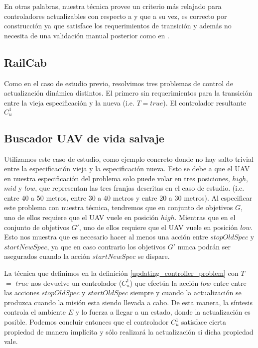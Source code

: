 En otras palabras, nuestra técnica provee un criterio más relajado para controladores actualizables con respecto a
\cite{6224401} y que a su vez, es correcto por construcción ya que satisface los requerimientos de transición y además
no necesita de una validación manual posterior como en \cite{PanzicaLaManna:2013:FCC:2487336.2487349}.

\subsection{RailCab}

Como en el caso de estudio previo, resolvimos tres problemas de control de actualización dinámica distintos. El primero
sin requerimientos para la transición entre la vieja especificación y la nueva (i.e. $T = true$). El controlador
resultante $C^1_u$

\subsection{Buscador UAV de vida salvaje}

Utilizamos este caso de estudio, como ejemplo concreto donde no hay salto trivial entre la especificación vieja y la
especificación nueva. Esto se debe a que el UAV en nuestra especificación del problema solo puede volar en tres
posiciones, $high$, $mid$ y $low$, que representan las tres franjas descritas en el caso de estudio. (i.e. entre 40 a 50
metros, entre 30 a 40 metros y entre 20 a 30 metros). Al especificar este problema con nuestra técnica, tendremos que en
conjunto de objetivos $G$, uno de ellos requiere que el UAV vuele en posición $high$. Mientras que en el conjunto de
objetivos $G'$, uno de ellos requiere que el UAV vuele en posición $low$. Esto nos muestra que es necesario hacer
al menos una acción entre $stopOldSpec$ y $startNewSpec$, ya que en caso contrario los objetivos $G'$ nunca podrán ser
asegurados cuando la acción $startNewSpec$ se dispare.

La técnica que definimos en la definición \ref{updating_controller_problem} con $T$ $=$ $true$ nos devuelve un controlador
($C_u^{1}$) que efectúa la acción $low$ entre entre las acciones $stopOldSpec$ y $startOldSpec$ siempre y cuando la
actualización se produzca cuando la misión esta siendo llevada a cabo. De esta manera, la síntesis controla el ambiente
$E$ y lo fuerza a llegar a un estado, donde la actualización es posible. Podemos concluir entonces que el controlador
$C_u^1$ satisface cierta propiedad de manera implícita y sólo realizará la actualización si dicha propiedad vale.


